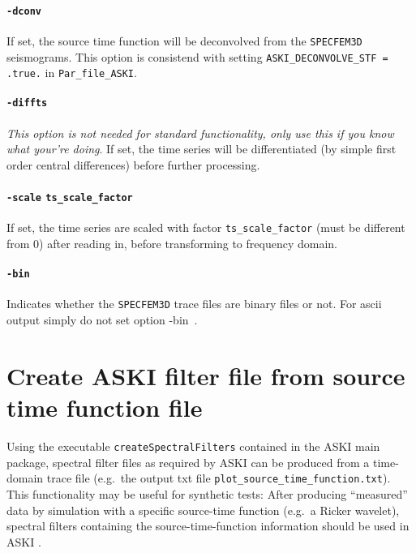 \documentclass[12pt,a4paper]{article}
\newcommand{\lcode}[1]{\nolinkurl{#1}}
\newcommand{\ASKI}{ {\ttfamily ASKI} }
\begin{document}
\paragraph{\lcode{-dconv}}
If set, the source time function will be deconvolved from the \lcode{SPECFEM3D} seismograms. This option
is consistend with setting \lcode{ASKI_DECONVOLVE_STF = .true.} in \lcode{Par_file_ASKI}.

\paragraph{\lcode{-diffts}}
\emph{This option is not needed for standard functionality, only use this if you know what your're doing}.
If set, the time series will be differentiated (by simple first order central differences) before further 
processing.

\paragraph{\lcode{-scale} \lcode{ts_scale_factor}}
If set, the time series are scaled with factor \lcode{ts_scale_factor} (must be different from 0) 
after reading in, before transforming to frequency domain.

\paragraph{\lcode{-bin}}
Indicates whether the \lcode{SPECFEM3D} trace files are binary files or not. For ascii output simply 
do not set option -bin~.

%
\section{Create \ASKI{} filter file from source time function file} \label{createSpecfem3dFilters}
%
Using the executable \lcode{createSpectralFilters} contained in the \ASKI{} main package, 
spectral filter files as required by \ASKI{} can be produced from a time-domain trace file 
(e.g.\ the output txt file \lcode{plot_source_time_function.txt}).
This functionality may be useful for synthetic tests: After producing ``measured'' data by simulation with
a specific source-time function (e.g.\ a Ricker wavelet), spectral filters containing the source-time-function
information should be used in \ASKI{}.
\end{document}
